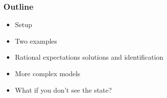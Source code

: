 \documentclass{beamer}
\begin{document}
\begin{frame}
\frametitle{Outline}
\begin{itemize} \itemsep=\bigskipamount
\item Setup
\item Two examples
\item Rational expectations solutions and identification
\item More complex models
\item What if you don't see the state?
\end{itemize}
\end{frame}

\end{document}
